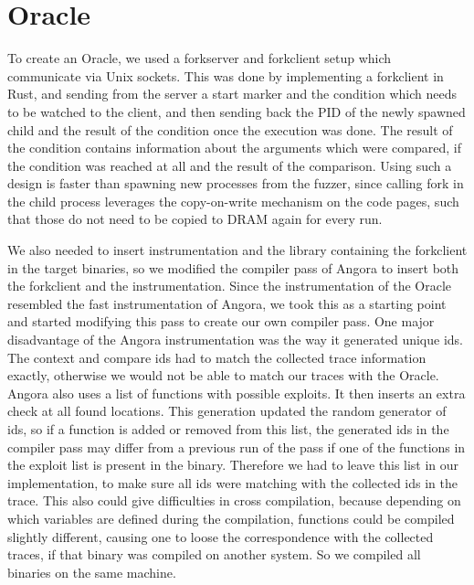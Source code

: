 
\section{Oracle}
To create an Oracle, we used a forkserver and forkclient setup which communicate via Unix sockets. This was done by implementing a forkclient in Rust, and sending from the server a start marker and the condition which needs to be watched to the client, and then sending back the PID of the newly spawned child and the result of the condition once the execution was done. The result of the condition contains information about the arguments which were compared, if the condition was reached at all and the result of the comparison. Using such a design is faster than spawning new processes from the fuzzer, since calling fork in the child process leverages the copy-on-write mechanism on the code pages, such that those do not need to be copied to DRAM again for every run.

We also needed to insert instrumentation and the library containing the forkclient in the target binaries, so we modified the compiler pass of Angora to insert both the forkclient and the instrumentation. Since the instrumentation of the Oracle resembled the fast instrumentation of Angora, we took this as a starting point and started modifying this pass to create our own compiler pass. One major disadvantage of the Angora instrumentation was the way it generated unique ids. The context and compare ids had to match the collected trace information exactly, otherwise we would not be able to match our traces with the Oracle. Angora also uses a list of functions with possible exploits. It then inserts an extra check at all found locations. This generation updated the random generator of ids, so if a function is added or removed from this list, the generated ids in the compiler pass may differ from a previous run of the pass if one of the functions in the exploit list is present in the binary. Therefore we had to leave this list in our implementation, to make sure all ids were matching with the collected ids in the trace. This also could give difficulties in cross compilation, because depending on which variables are defined during the compilation, functions could be compiled slightly different, causing one to loose the correspondence with the collected traces, if that binary was compiled on another system. So we compiled all binaries on the same machine.

